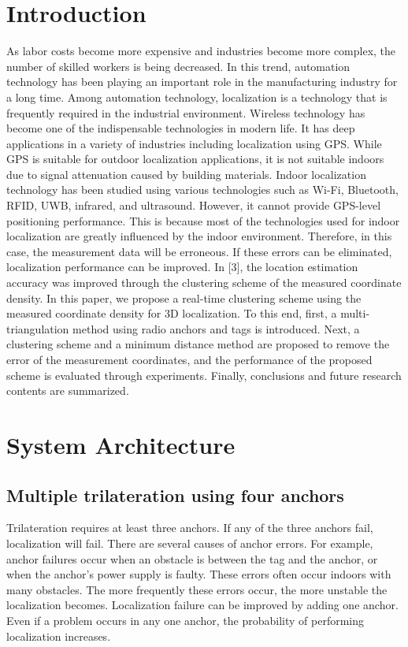 \documentclass[conference]{IEEEtran}
\begin{document}
\section{Introduction}
As labor costs become more expensive and industries become more complex, the number of skilled workers is being decreased. In this trend, automation technology has been playing an important role in the manufacturing industry for a long time\cite{b1}. Among automation technology, localization is a technology that is frequently required in the industrial environment. Wireless technology has become one of the indispensable technologies in modern life. It has deep applications in a variety of industries including localization using GPS\cite{b2}. While GPS is suitable for outdoor localization applications, it is not suitable indoors due to signal attenuation caused by building materials. Indoor localization technology has been studied using various technologies such as Wi-Fi, Bluetooth, RFID, UWB, infrared, and ultrasound\cite{b3}. However, it cannot provide GPS-level positioning performance. This is because most of the technologies used for indoor localization are greatly influenced by the indoor environment. Therefore, in this case, the measurement data will be erroneous. If these errors can be eliminated, localization performance can be improved. In [3], the location estimation accuracy was improved through the clustering scheme of the measured coordinate density\cite{b4}. In this paper, we propose a real-time clustering scheme using the measured coordinate density for 3D localization. To this end, first, a multi-triangulation method using radio anchors and tags is introduced\cite{b5}. Next, a clustering scheme and a minimum distance method are proposed to remove the error of the measurement coordinates, and the performance of the proposed scheme is evaluated through experiments\cite{b6}. Finally, conclusions and future research contents are summarized\cite{b7}.

\section{System Architecture}

\subsection{Multiple trilateration using four anchors}
Trilateration requires at least three anchors. If any of the three anchors fail, localization will fail. There are several causes of anchor errors. For example, anchor failures occur when an obstacle is between the tag and the anchor, or when the anchor's power supply is faulty. These errors often occur indoors with many obstacles. The more frequently these errors occur, the more unstable the localization becomes. 
Localization failure can be improved by adding one anchor. 
Even if a problem occurs in any one anchor, the probability of performing localization increases.
\end{document}
